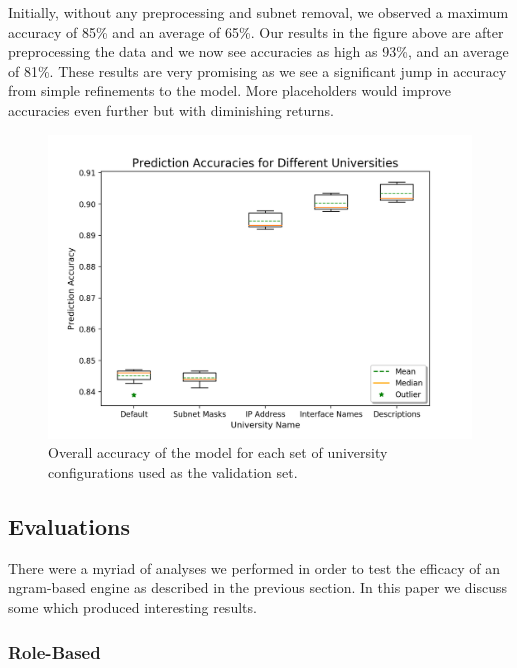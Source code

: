 Initially, without any preprocessing and subnet removal, we observed a maximum accuracy of 85\% and an average of 65\%. Our results in the figure above are after preprocessing the data and we now see accuracies as high as 93\%, and an average of 81\%. These results are very promising as we see a significant jump in accuracy from simple refinements to the model. More placeholders would improve accuracies even further but with diminishing returns.

\begin{figure}[H]
	\centering
	\includegraphics[width=\textwidth]{placeholders.png}
	\caption{Overall accuracy of the model for each set of university configurations used as the validation set.}
\end{figure}


\subsection{Evaluations}

There were a myriad of analyses we performed in order to test the efficacy of an ngram-based engine as described in the previous section. In this paper we discuss some which produced interesting results.

\subsubsection{Role-Based}

